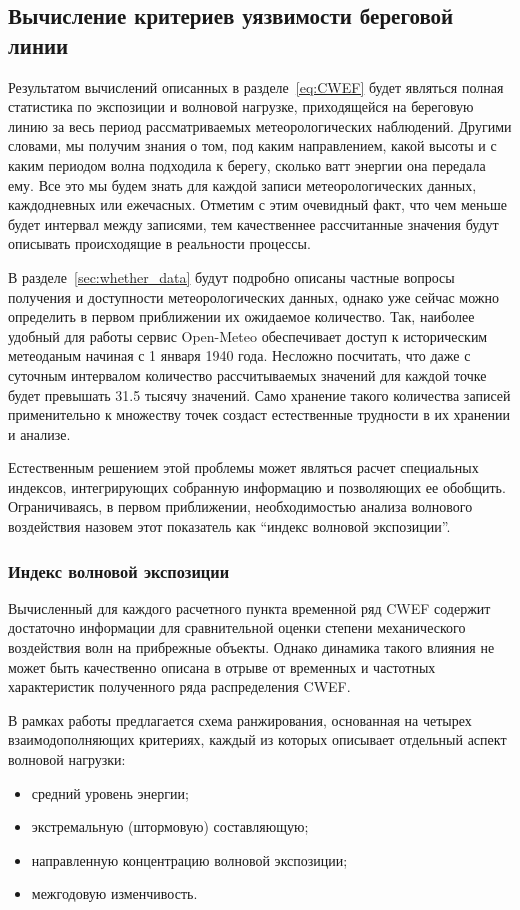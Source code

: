 
\subsection{Вычисление критериев уязвимости береговой линии}

Результатом вычислений описанных в разделе~\ref{eq:CWEF} будет являться полная статистика по экспозиции и волновой нагрузке, приходящейся на береговую линию за весь период рассматриваемых метеорологических наблюдений.
Другими словами, мы получим знания о том, под каким направлением, какой высоты и с каким периодом волна подходила к берегу, сколько ватт энергии она передала ему.
Все это мы будем знать для каждой записи метеорологических данных, каждодневных или ежечасных.
Отметим с этим очевидный факт, что чем меньше будет интервал между записями, тем качественнее рассчитанные значения будут описывать происходящие в реальности процессы.

В разделе~\ref{sec:whether_data} будут подробно описаны частные вопросы получения и доступности метеорологических данных, однако уже сейчас можно определить в первом приближении их ожидаемое количество.
Так, наиболее удобный для работы сервис Open-Meteo обеспечивает доступ к историческим метеоданым начиная с 1 января 1940 года.
Несложно посчитать, что даже с суточным интервалом количество рассчитываемых значений для каждой точке будет превышать 31.5 тысячу значений.
Само хранение такого количества записей применительно к множеству точек создаст естественные трудности в их хранении и анализе.

Естественным решением этой проблемы может являться расчет специальных индексов, интегрирующих собранную информацию и позволяющих ее обобщить.
Ограничиваясь, в первом приближении, необходимостью анализа волнового воздействия назовем этот показатель как \enquote{индекс волновой экспозиции}.

\subsubsection{Индекс волновой экспозиции}
\label{sec:wer_calculation}

Вычисленный для каждого расчетного пункта временной ряд CWEF содержит достаточно информации для сравнительной оценки степени механического воздействия волн на прибрежные объекты.
Однако динамика такого влияния не может быть качественно описана в отрыве от временных и частотных характеристик полученного ряда распределения CWEF.

В рамках работы предлагается схема ранжирования, основанная на четырех взаимодополняющих критериях, каждый из которых описывает отдельный аспект волновой нагрузки: 
\begin{itemize}
    \item средний уровень энергии;
    \item экстремальную (штормовую) составляющую;
    \item направленную концентрацию волновой экспозиции;
    \item межгодовую изменчивость.
\end{itemize}

